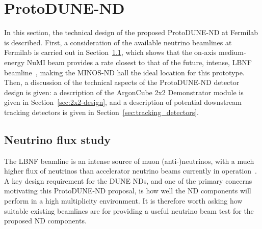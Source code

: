 \section{ProtoDUNE-ND}
\label{sec:protodune-nd}
In this section, the technical design of the proposed ProtoDUNE-ND at Fermilab is described. First, a consideration of the available neutrino beamlines at Fermilab is carried out in Section~\ref{sec:neutrino-flux}, which shows that the on-axis medium-energy NuMI beam provides a rate closest to that of the future, intense, LBNF beamline~\cite{DUNE3, dune_opt_flux}, making the MINOS-ND hall the ideal location for this prototype. %
Then, a discussion of the technical aspects of the ProtoDUNE-ND detector design is given: a description of the ArgonCube 2x2 Demonstrator module is given in Section~\ref{sec:2x2-design}, and a description of potential downstream tracking detectors is given in Section~\ref{sec:tracking_detectors}. %

\subsection{Neutrino flux study}
\label{sec:neutrino-flux}
The LBNF beamline is an intense source of muon (anti-)neutrinos, with a much higher flux of neutrinos than accelerator neutrino beams currently in operation~\cite{DUNE3,dune_opt_flux}. A key design requirement for the DUNE NDs, and one of the primary concerns motivating this ProtoDUNE-ND proposal, is how well the ND components will perform in a high multiplicity environment. It is therefore worth asking how suitable existing beamlines are for providing a useful neutrino beam test for the proposed ND components.

